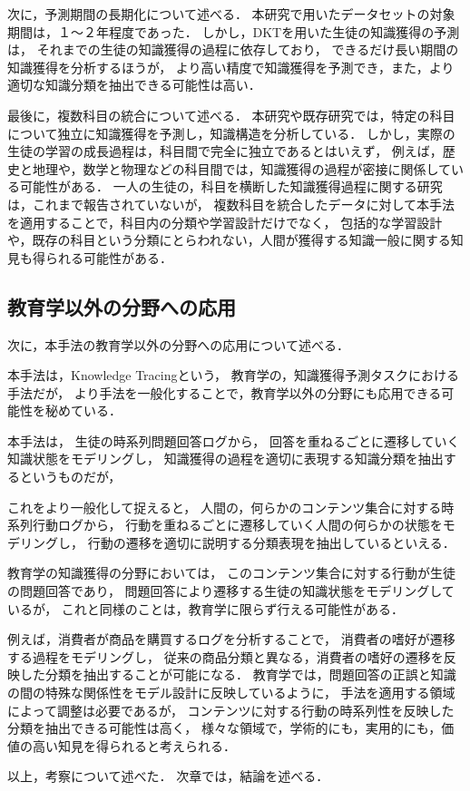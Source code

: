 次に，予測期間の長期化について述べる．
本研究で用いたデータセットの対象期間は，１〜２年程度であった．
しかし，DKTを用いた生徒の知識獲得の予測は，
それまでの生徒の知識獲得の過程に依存しており，
できるだけ長い期間の知識獲得を分析するほうが，
より高い精度で知識獲得を予測でき，また，より適切な知識分類を抽出できる可能性は高い．


最後に，複数科目の統合について述べる．
本研究や既存研究では，特定の科目について独立に知識獲得を予測し，知識構造を分析している．
しかし，実際の生徒の学習の成長過程は，科目間で完全に独立であるとはいえず，
例えば，歴史と地理や，数学と物理などの科目間では，知識獲得の過程が密接に関係している可能性がある．
一人の生徒の，科目を横断した知識獲得過程に関する研究は，これまで報告されていないが，
複数科目を統合したデータに対して本手法を適用することで，科目内の分類や学習設計だけでなく，
包括的な学習設計や，既存の科目という分類にとらわれない，人間が獲得する知識一般に関する知見も得られる可能性がある．



\subsection{教育学以外の分野への応用}
次に，本手法の教育学以外の分野への応用について述べる．

本手法は，Knowledge Tracingという，
教育学の，知識獲得予測タスクにおける手法だが，
より手法を一般化することで，教育学以外の分野にも応用できる可能性を秘めている．

本手法は，
生徒の時系列問題回答ログから，
回答を重ねるごとに遷移していく知識状態をモデリングし，
知識獲得の過程を適切に表現する知識分類を抽出するというものだが，

これをより一般化して捉えると，
人間の，何らかのコンテンツ集合に対する時系列行動ログから，
行動を重ねるごとに遷移していく人間の何らかの状態をモデリングし，
行動の遷移を適切に説明する分類表現を抽出しているといえる．

教育学の知識獲得の分野においては，
このコンテンツ集合に対する行動が生徒の問題回答であり，
問題回答により遷移する生徒の知識状態をモデリングしているが，
これと同様のことは，教育学に限らず行える可能性がある．

例えば，消費者が商品を購買するログを分析することで，
消費者の嗜好が遷移する過程をモデリングし，
従来の商品分類と異なる，消費者の嗜好の遷移を反映した分類を抽出することが可能になる．
教育学では，問題回答の正誤と知識の間の特殊な関係性をモデル設計に反映しているように，
手法を適用する領域によって調整は必要であるが，
コンテンツに対する行動の時系列性を反映した分類を抽出できる可能性は高く，
様々な領域で，学術的にも，実用的にも，価値の高い知見を得られると考えられる．




\vvspace
以上，考察について述べた．
次章では，結論を述べる．
